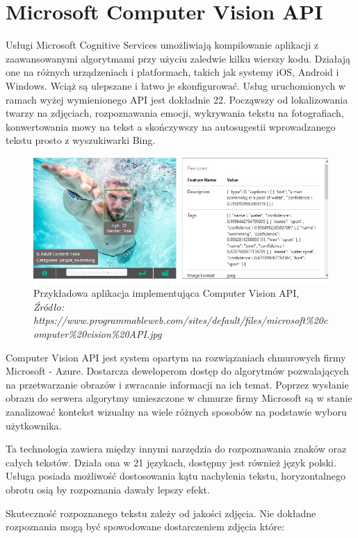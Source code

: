 \documentclass[brudnopis]{xmgr}
\begin{document}
\section{Microsoft Computer Vision API}

Usługi Microsoft Cognitive Services\cite{9} umożliwiają kompilowanie aplikacji z zaawansowanymi algorytmami przy użyciu zaledwie kilku wierszy kodu. Działają one na różnych urządzeniach i platformach, takich jak systemy iOS, Android i Windows. Wciąż są ulepszane i łatwo je skonfigurować. Usług uruchomionych w ramach wyżej wymienionego API jest dokładnie 22. Począwszy od lokalizowania twarzy na zdjęciach, rozpoznawania emocji, wykrywania tekstu na fotografiach, konwertowania mowy na tekst a skończywszy na autosugestii wprowadzanego tekstu prosto z wyszukiwarki Bing.

\begin{figure}[!tbh]
\centering
\includegraphics[width=.8\hsize]{fig/mscvapi}
\caption{Przykładowa aplikacja implementująca Computer Vision API, \emph{Źródło: https://www.programmableweb.com/sites/default/files/microsoft\%20computer\%20vision\%20API.jpg}}
\end{figure}
\newpage

Computer Vision API jest system opartym na rozwiązaniach chmurowych firmy Microsoft - Azure. Dostarcza deweloperom dostęp do algorytmów pozwalających na przetwarzanie obrazów i zwracanie informacji na ich temat. Poprzez wysłanie obrazu do serwera algorytmy umieszczone w chmurze firmy Microsoft są w stanie zanalizować kontekst wizualny na wiele różnych sposobów na podstawie wyboru użytkownika.

Ta technologia zawiera między innymi narzędzia do rozpoznawania znaków oraz całych tekstów. Działa ona w 21 językach, dostępny jest również język polski. Usługa posiada możliwość dostosowania kątu nachylenia tekstu, horyzontalnego obrotu osią by rozpoznania dawały lepszy efekt. 

Skuteczność rozpoznanego tekstu zależy od jakości zdjęcia. Nie dokładne rozpoznania mogą być spowodowane dostarczeniem zdjęcia które:
\end{document}
